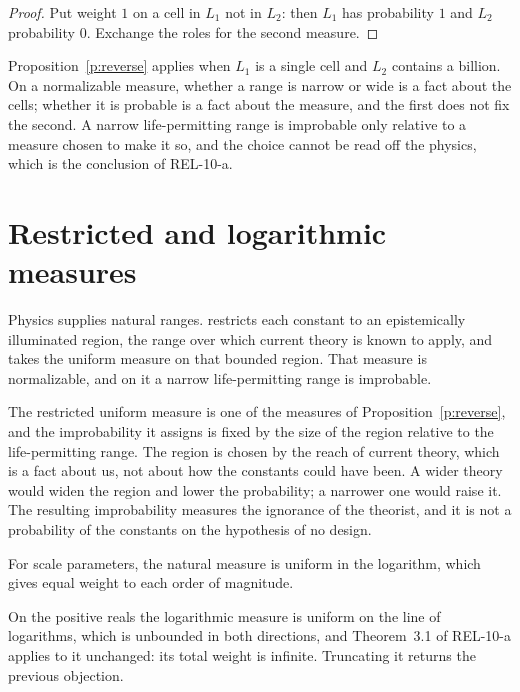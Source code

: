 \documentclass{situationist-preprint}
\begin{document}
\begin{proof}
Put weight $1$ on a cell in $L_1$ not in $L_2$: then $L_1$ has probability $1$ and $L_2$ probability $0$. Exchange the roles for the second measure.
\end{proof}

Proposition~\ref{p:reverse} applies when $L_1$ is a single cell and $L_2$ contains a billion. On a normalizable measure, whether a range is narrow or wide is a fact about the cells; whether it is probable is a fact about the measure, and the first does not fix the second. A narrow life-permitting range is improbable only relative to a measure chosen to make it so, and the choice cannot be read off the physics, which is the conclusion of REL-10-a.

\section{Restricted and logarithmic measures}

\begin{objection}
Physics supplies natural ranges. \citet{Collins2009} restricts each constant to an epistemically illuminated region, the range over which current theory is known to apply, and takes the uniform measure on that bounded region. That measure is normalizable, and on it a narrow life-permitting range is improbable.
\end{objection}

\begin{reply}
The restricted uniform measure is one of the measures of Proposition~\ref{p:reverse}, and the improbability it assigns is fixed by the size of the region relative to the life-permitting range. The region is chosen by the reach of current theory, which is a fact about us, not about how the constants could have been. A wider theory would widen the region and lower the probability; a narrower one would raise it. The resulting improbability measures the ignorance of the theorist, and it is not a probability of the constants on the hypothesis of no design.
\end{reply}

\begin{objection}
For scale parameters, the natural measure is uniform in the logarithm, which gives equal weight to each order of magnitude.
\end{objection}

\begin{reply}
On the positive reals the logarithmic measure is uniform on the line of logarithms, which is unbounded in both directions, and Theorem~3.1 of REL-10-a applies to it unchanged: its total weight is infinite. Truncating it returns the previous objection.
\end{reply}
\end{document}

